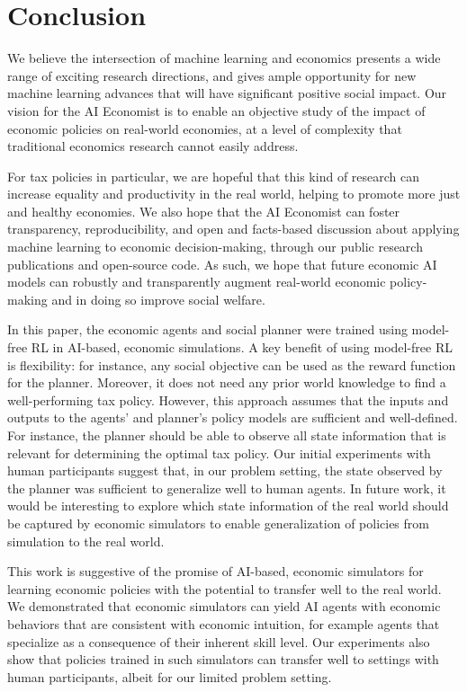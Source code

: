 \section{Conclusion}
\label{sec:conclusion}

We believe the intersection of machine learning and economics presents a wide range of exciting research directions, and gives ample opportunity for new machine learning advances that will have significant positive social impact.
Our vision for the AI Economist is to enable an objective study of the impact of economic policies on real-world economies, at a level of complexity that traditional economics research cannot easily address. 

For tax policies in particular, we are hopeful that this kind of research can increase equality and productivity in the real world, helping to promote more just and healthy economies. We also hope that the AI Economist can foster transparency, reproducibility, and open and facts-based discussion about applying machine learning to economic decision-making, through our public research publications and open-source code. As such, we hope that future economic AI models can robustly and transparently augment real-world economic policy-making and in doing so improve social welfare.

In this paper, the economic agents and social planner were trained using model-free RL in AI-based, economic simulations.
A key benefit of using model-free RL is flexibility: for instance, any social objective can be used as the reward function for the planner. Moreover, it does not need any prior world knowledge to find a well-performing tax policy.
However, this approach assumes that the inputs and outputs to the agents' and planner's policy models are sufficient and well-defined. For instance, the planner should be able to observe all state information that is relevant for determining the optimal tax policy. Our initial experiments with human participants suggest that, in our problem setting, the state observed by the planner was sufficient to generalize well to human agents.
In future work, it would be interesting to explore which state information of the real world should be captured by economic simulators to enable generalization of policies from simulation to the real world.

This work is suggestive of the promise of AI-based, economic simulators for  learning economic policies with the potential to transfer well to the real world. 
We demonstrated that economic simulators can yield AI agents with economic behaviors that are consistent with economic intuition, for example agents that specialize as a consequence of their inherent skill level.
Our experiments also show that policies trained in such simulators can transfer well to settings with human participants, albeit for our limited problem setting.

